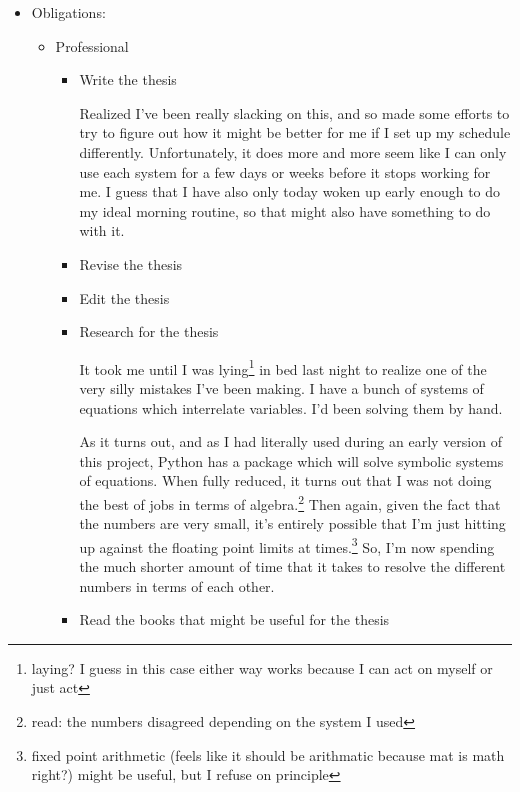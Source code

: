 \documentclass[12pt]{article}
\renewcommand{\,}{\textsuperscript{,}}
\begin{document}
\begin{itemize}

\item Obligations:

\begin{itemize}

\item Professional

\begin{itemize}

\item Write the thesis

Realized I've been really slacking on this, and so made some efforts to try to figure out how it might be better for me if I set up my schedule differently.  
Unfortunately, it does more and more seem like I can only use each system for a few days or weeks before it stops working for me.  
I guess that I have also only today woken up early enough to do my ideal morning routine, so that might also have something to do with it.

\item Revise the thesis

\item Edit the thesis

\item Research for the thesis

It took me until I was lying\footnote{laying? I guess in this case either way works because I can act on myself or just act} in bed last night to realize one of the very silly mistakes I've been making.  
I have a bunch of systems of equations which interrelate variables.  
I'd been solving them by hand.

As it turns out, and as I had literally used during an early version of this project, Python has a package which will solve symbolic systems of equations.  
When fully reduced, it turns out that I was not doing the best of jobs in terms of algebra.\footnote{read: the numbers disagreed depending on the system I used}  
Then again, given the fact that the numbers are very small, it's entirely possible that I'm just hitting up against the floating point limits at times.\footnote{fixed point arithmetic (feels like it should be arithmatic because mat is math right?) might be useful, but I refuse on principle}  
So, I'm now spending the much shorter amount of time that it takes to resolve the different numbers in terms of each other.

\item Read the books that might be useful for the thesis


\end{itemize}
\end{itemize}
\end{itemize}
\end{document}
